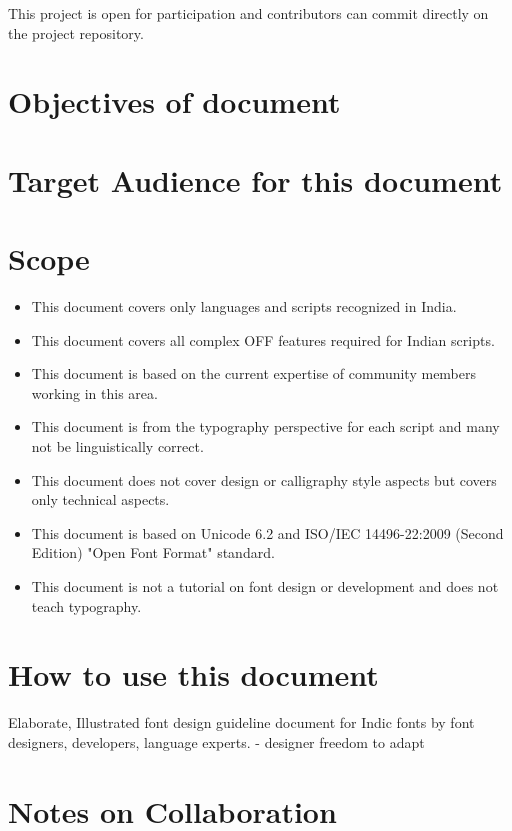 This project is open for participation and contributors can commit directly on 
the project repository.

\section{Objectives of document}

\section{Target Audience for this document}

\section{Scope}
\begin{itemize}
\item This document covers only languages and scripts recognized in India.
\item This document covers all complex OFF features required for Indian scripts.
\item This document is based on the current expertise of community members 
working in this area.
\item This document is from the typography perspective for each script and many 
not be linguistically correct.
\item This document does not cover design or calligraphy style aspects but 
covers only technical aspects.
\item This document is based on Unicode 6.2 and ISO/IEC 14496-22:2009 (Second 
Edition) "Open Font Format" standard.
\item This document is not a tutorial on font design or development and does not 
teach typography.
\end{itemize}

\section{How to use this document}

Elaborate, Illustrated font design guideline document for Indic fonts by font 
designers, developers, language experts.
- designer freedom to adapt

\section{Notes on Collaboration}
